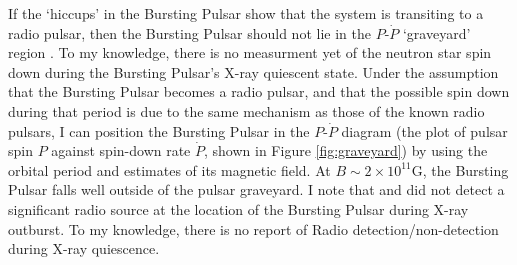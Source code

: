 \par If the `hiccups' in the Bursting Pulsar show that the system is transiting to a radio pulsar, then the Bursting Pulsar should not lie in the $P$-$\dot{P}$ `graveyard' region \citep[e.g.][]{vandenHeuvel_Graveyard}. To my knowledge, there is no measurment yet of the neutron star spin down during the Bursting Pulsar's X-ray quiescent state. Under the assumption that the Bursting Pulsar becomes a radio pulsar, and that the possible spin down during that period is due to the same mechanism as those of the known radio pulsars, I can position the Bursting Pulsar in the $P$-$\dot{P}$ diagram (the plot of pulsar spin $P$ against spin-down rate $\dot{P}$, shown in Figure \ref{fig:graveyard}) by using the orbital period and estimates of its magnetic field. At $B\sim2\times10^{11}$G, the Bursting Pulsar falls well outside of the pulsar graveyard. I note that \citet{Pandey-Pommier_BPRad} and \citet{Russell_BPRad} did not detect a significant radio source at the location of the Bursting Pulsar during X-ray outburst. To my knowledge, there is no report of Radio detection/non-detection during X-ray quiescence.

